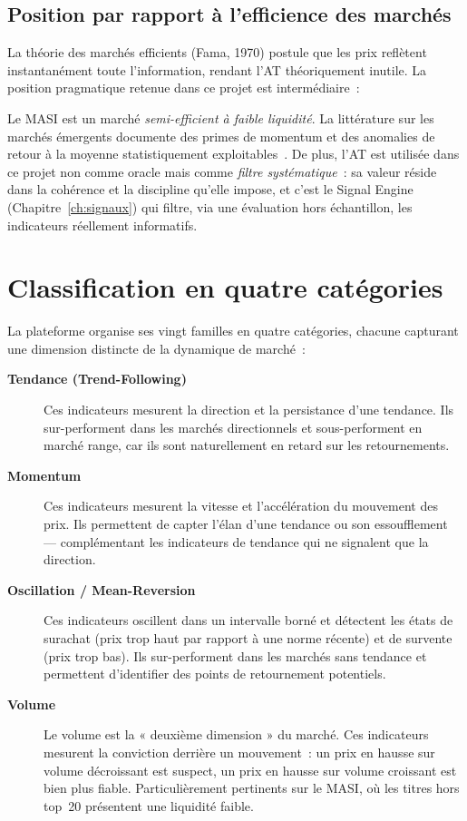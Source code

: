 \subsection{Position par rapport à l'efficience des marchés}

La théorie des marchés efficients (Fama, 1970) postule que les prix reflètent
instantanément toute l'information, rendant l'AT théoriquement inutile. La position
pragmatique retenue dans ce projet est intermédiaire~:

Le MASI est un marché \textit{semi-efficient à faible liquidité}. La littérature
sur les marchés émergents documente des primes de momentum et des anomalies de retour
à la moyenne statistiquement exploitables~\cite{harvey2016}. De plus, l'AT est
utilisée dans ce projet non comme oracle mais comme \textit{filtre systématique}~:
sa valeur réside dans la cohérence et la discipline qu'elle impose, et c'est le
Signal Engine (Chapitre~\ref{ch:signaux}) qui filtre, via une évaluation hors
échantillon, les indicateurs réellement informatifs.

\section{Classification en quatre catégories}
\label{sec:at_classification}

La plateforme organise ses vingt familles en quatre catégories, chacune capturant une
dimension distincte de la dynamique de marché~:

\begin{description}
    \item[\textbf{Tendance (Trend-Following)}]
    Ces indicateurs mesurent la direction et la persistance d'une tendance. Ils
    sur-performent dans les marchés directionnels et sous-performent en marché range,
    car ils sont naturellement en retard sur les retournements.

    \item[\textbf{Momentum}]
    Ces indicateurs mesurent la vitesse et l'accélération du mouvement des prix. Ils
    permettent de capter l'élan d'une tendance ou son essoufflement — complémentant
    les indicateurs de tendance qui ne signalent que la direction.

    \item[\textbf{Oscillation / Mean-Reversion}]
    Ces indicateurs oscillent dans un intervalle borné et détectent les états de
    surachat (prix trop haut par rapport à une norme récente) et de survente (prix
    trop bas). Ils sur-performent dans les marchés sans tendance et permettent d'identifier
    des points de retournement potentiels.

    \item[\textbf{Volume}]
    Le volume est la « deuxième dimension » du marché. Ces indicateurs mesurent la
    conviction derrière un mouvement~: un prix en hausse sur volume décroissant est
    suspect, un prix en hausse sur volume croissant est bien plus fiable. Particulièrement
    pertinents sur le MASI, où les titres hors top~20 présentent une liquidité faible.
\end{description}

